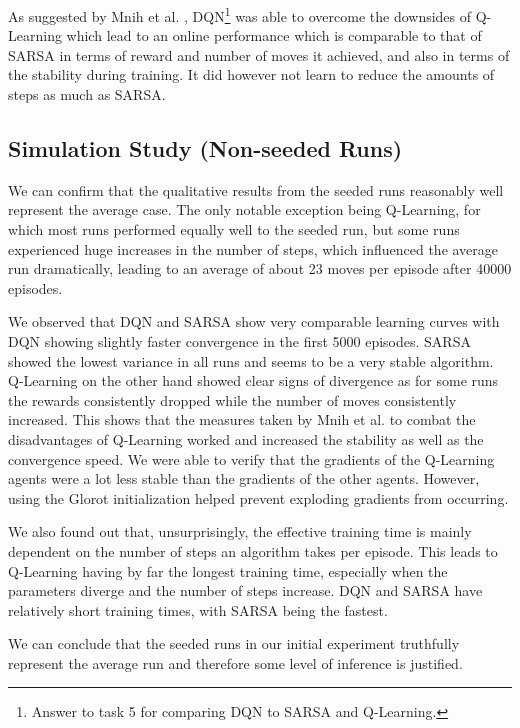 \documentclass[conference]{IEEEtran}
\begin{document}
As suggested by Mnih et al. \cite{atari2013, dqn2015}, DQN\footnote{Answer to task 5 for comparing DQN to SARSA and Q-Learning.} was able to overcome the downsides of Q-Learning which lead to an online performance which is comparable to that of SARSA in terms of reward and number of moves it achieved, and also in terms of the stability during training. It did however not learn to reduce the amounts of steps as much as SARSA.


\subsection{Simulation Study (Non-seeded Runs)}

We can confirm that the qualitative results from the seeded runs reasonably well represent the average case. The only notable exception being Q-Learning, for which most runs performed equally well to the seeded run, but some runs experienced huge increases in the number of steps, which influenced the average run dramatically, leading to an average of about 23 moves per episode after 40000 episodes.

We observed that DQN and SARSA show very comparable learning curves with DQN showing slightly faster convergence in the first 5000 episodes. SARSA showed the lowest variance in all runs and seems to be a very stable algorithm. Q-Learning on the other hand showed clear signs of divergence as for some runs the rewards consistently dropped while the number of moves consistently increased. This shows that the measures taken by Mnih et al. \cite{dqn2015} to combat the disadvantages of Q-Learning worked and increased the stability as well as the convergence speed. We were able to verify that the gradients of the Q-Learning agents were a lot less stable than the gradients of the other agents. However, using the Glorot initialization \cite{glorot2010} helped prevent exploding gradients from occurring.

We also found out that, unsurprisingly, the effective training time is mainly dependent on the number of steps an algorithm takes per episode. This leads to Q-Learning having by far the longest training time, especially when the parameters diverge and the number of steps increase. DQN and SARSA have relatively short training times, with SARSA being the fastest.

We can conclude that the seeded runs in our initial experiment truthfully represent the average run and therefore some level of inference is justified.
\end{document}
